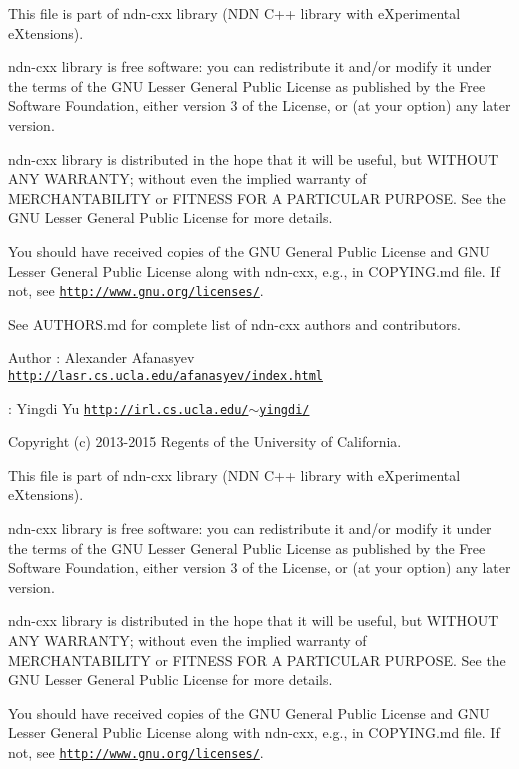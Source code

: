 This file is part of ndn-\/cxx library (N\+DN C++ library with e\+Xperimental e\+Xtensions).

ndn-\/cxx library is free software\+: you can redistribute it and/or modify it under the terms of the G\+NU Lesser General Public License as published by the Free Software Foundation, either version 3 of the License, or (at your option) any later version.

ndn-\/cxx library is distributed in the hope that it will be useful, but W\+I\+T\+H\+O\+UT A\+NY W\+A\+R\+R\+A\+N\+TY; without even the implied warranty of M\+E\+R\+C\+H\+A\+N\+T\+A\+B\+I\+L\+I\+TY or F\+I\+T\+N\+E\+SS F\+OR A P\+A\+R\+T\+I\+C\+U\+L\+AR P\+U\+R\+P\+O\+SE. See the G\+NU Lesser General Public License for more details.

You should have received copies of the G\+NU General Public License and G\+NU Lesser General Public License along with ndn-\/cxx, e.\+g., in C\+O\+P\+Y\+I\+N\+G.\+md file. If not, see \href{http://www.gnu.org/licenses/}{\tt http\+://www.\+gnu.\+org/licenses/}.

See A\+U\+T\+H\+O\+R\+S.\+md for complete list of ndn-\/cxx authors and contributors.

\begin{DoxyAuthor}{Author}
\+: Alexander Afanasyev \href{http://lasr.cs.ucla.edu/afanasyev/index.html}{\tt http\+://lasr.\+cs.\+ucla.\+edu/afanasyev/index.\+html} 

\+: Yingdi Yu \href{http://irl.cs.ucla.edu/~yingdi/}{\tt http\+://irl.\+cs.\+ucla.\+edu/$\sim$yingdi/}
\end{DoxyAuthor}
Copyright (c) 2013-\/2015 Regents of the University of California.

This file is part of ndn-\/cxx library (N\+DN C++ library with e\+Xperimental e\+Xtensions).

ndn-\/cxx library is free software\+: you can redistribute it and/or modify it under the terms of the G\+NU Lesser General Public License as published by the Free Software Foundation, either version 3 of the License, or (at your option) any later version.

ndn-\/cxx library is distributed in the hope that it will be useful, but W\+I\+T\+H\+O\+UT A\+NY W\+A\+R\+R\+A\+N\+TY; without even the implied warranty of M\+E\+R\+C\+H\+A\+N\+T\+A\+B\+I\+L\+I\+TY or F\+I\+T\+N\+E\+SS F\+OR A P\+A\+R\+T\+I\+C\+U\+L\+AR P\+U\+R\+P\+O\+SE. See the G\+NU Lesser General Public License for more details.

You should have received copies of the G\+NU General Public License and G\+NU Lesser General Public License along with ndn-\/cxx, e.\+g., in C\+O\+P\+Y\+I\+N\+G.\+md file. If not, see \href{http://www.gnu.org/licenses/}{\tt http\+://www.\+gnu.\+org/licenses/}.

